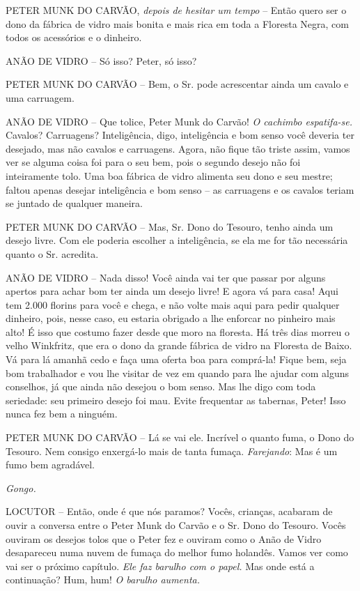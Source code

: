 PETER MUNK DO CARVÃO, \emph{depois de hesitar um tempo} -- Então quero
ser o dono da fábrica de vidro mais bonita e mais rica em toda a
Floresta Negra, com todos os acessórios e o dinheiro.

ANÃO DE VIDRO -- Só isso? Peter, só isso?

PETER MUNK DO CARVÃO -- Bem, o Sr. pode acrescentar ainda um cavalo e
uma carruagem.

ANÃO DE VIDRO -- Que tolice, Peter Munk do Carvão! \emph{O cachimbo
espatifa-se.} Cavalos? Carruagens? Inteligência, digo, inteligência e
bom senso você deveria ter desejado, mas não cavalos e carruagens.
Agora, não fique tão triste assim, vamos ver se alguma coisa foi para o
seu bem, pois o segundo desejo não foi inteiramente tolo. Uma boa
fábrica de vidro alimenta seu dono e seu mestre; faltou apenas desejar
inteligência e bom senso -- as carruagens e os cavalos teriam se juntado
de qualquer maneira.

PETER MUNK DO CARVÃO -- Mas, Sr. Dono do Tesouro, tenho ainda um desejo
livre. Com ele poderia escolher a inteligência, se ela me for tão
necessária quanto o Sr. acredita.

ANÃO DE VIDRO -- Nada disso! Você ainda vai ter que passar por alguns
apertos para achar bom ter ainda um desejo livre! E agora vá para casa!
Aqui tem 2.000 florins para você e chega, e não volte mais aqui para
pedir qualquer dinheiro, pois, nesse caso, eu estaria obrigado a lhe
enforcar no pinheiro mais alto! É isso que costumo fazer desde que moro
na floresta. Há três dias morreu o velho Winkfritz, que era o dono da
grande fábrica de vidro na Floresta de Baixo. Vá para lá amanhã cedo e
faça uma oferta boa para comprá-la! Fique bem, seja bom trabalhador e
vou lhe visitar de vez em quando para lhe ajudar com alguns conselhos,
já que ainda não desejou o bom senso. Mas lhe digo com toda seriedade:
seu primeiro desejo foi mau. Evite frequentar as tabernas, Peter! Isso
nunca fez bem a ninguém.

PETER MUNK DO CARVÃO -- Lá se vai ele. Incrível o quanto fuma, o Dono do
Tesouro. Nem consigo enxergá-lo mais de tanta fumaça. \emph{Farejando}:
Mas é um fumo bem agradável.

\emph{Gongo.}

LOCUTOR -- Então, onde é que nós paramos? Vocês, crianças, acabaram de
ouvir a conversa entre o Peter Munk do Carvão e o Sr. Dono do Tesouro.
Vocês ouviram os desejos tolos que o Peter fez e ouviram como o Anão de
Vidro desapareceu numa nuvem de fumaça do melhor fumo holandês. Vamos
ver como vai ser o próximo capítulo. \emph{Ele faz barulho com o papel.}
Mas onde está a continuação? Hum, hum! \emph{O barulho aumenta.}

